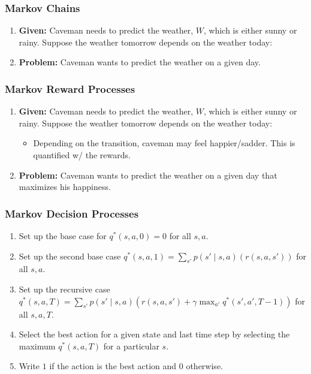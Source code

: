 \subsubsection{Markov Chains}
\begin{example}
    \begin{enumerate}
        \item \textbf{Given:} Caveman needs to predict the weather, $W$, which is either sunny or rainy. Suppose the weather tomorrow depends on the weather today:
        \item \textbf{Problem:} Caveman wants to predict the weather on a given day.
    \end{enumerate}
\end{example}

\subsubsection{Markov Reward Processes}
\begin{example}
    \begin{enumerate}
        \item \textbf{Given:} Caveman needs to predict the weather, $W$, which is either sunny or rainy. Suppose the weather tomorrow depends on the weather today:
        \begin{itemize}
            \item Depending on the transition, caveman may feel happier/sadder. This is quantified w/ the rewards.
        \end{itemize}
        \item \textbf{Problem:} Caveman wants to predict the weather on a given day that maximizes his happiness.
    \end{enumerate}
\end{example}
\newpage

\subsubsection{Markov Decision Processes}
\begin{process}
    \begin{enumerate}
        \item Set up the base case for $q^*(s,a,0) = 0$ for all $s,a$.
        \item Set up the second base case $q^*(s,a,1) = \sum_{s'} p(s' \mid s, a) \left( r(s, a, s') \right)$ for all $s,a$.
        \item Set up the recursive case $q^*(s,a,T) = \sum_{s'} p(s' \mid s, a) \left( r(s, a, s') + \gamma \max_{a'} q^*(s',a',T-1) \right)$ for all $s,a,T$.
        \item Select the best action for a given state and last time step by selecting the maximum $q^*(s,a,T)$ for a particular $s$.
        \item Write $1$ if the action is the best action and $0$ otherwise.
    \end{enumerate}
\end{process}

